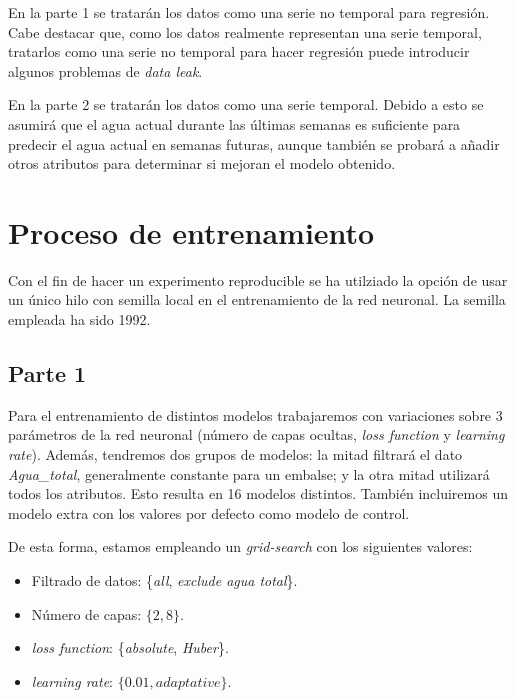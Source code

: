 \documentclass[12pt]{report} %
\begin{document}
    En la parte 1 se tratarán los datos como una serie no temporal para regresión.
    Cabe destacar que, como los datos realmente representan una serie temporal,
    tratarlos como una serie no temporal para hacer regresión puede introducir
    algunos problemas de \textit{data leak}.

    En la parte 2 se tratarán los datos como una serie temporal. Debido a esto
    se asumirá que el agua actual durante las últimas semanas es suficiente para
    predecir el agua actual en semanas futuras, aunque también se probará a añadir
    otros atributos para determinar si mejoran el modelo obtenido.

\chapter{Proceso de entrenamiento}
\label{chap:train}
    Con el fin de hacer un experimento reproducible se ha utilziado la opción de usar un único hilo con semilla local en el entrenamiento de la red neuronal. La semilla empleada ha sido 1992.
	\section{Parte 1}

        Para el entrenamiento de distintos modelos trabajaremos con variaciones sobre 3 parámetros de la red neuronal (número de capas ocultas, \textit{loss function} y \textit{learning rate}). Además, tendremos dos grupos de modelos: la mitad filtrará el dato \textit{Agua\_total}, generalmente constante para un embalse; y la otra mitad utilizará todos los atributos. Esto resulta en 16 modelos distintos. También incluiremos un modelo extra con los valores por defecto como modelo de control.

        De esta forma, estamos empleando un \textit{grid-search} con los siguientes valores:
        \begin{itemize}
            \item Filtrado de datos: \{\textit{all}, \textit{exclude agua total}\}.
            \item Número de capas: $\{2, 8\}$.
            \item \textit{loss function}: \{\textit{absolute}, \textit{Huber}\}.
            \item \textit{learning rate}: $\{0.01, \textit{adaptative}\}$.
        \end{itemize}
\end{document}
